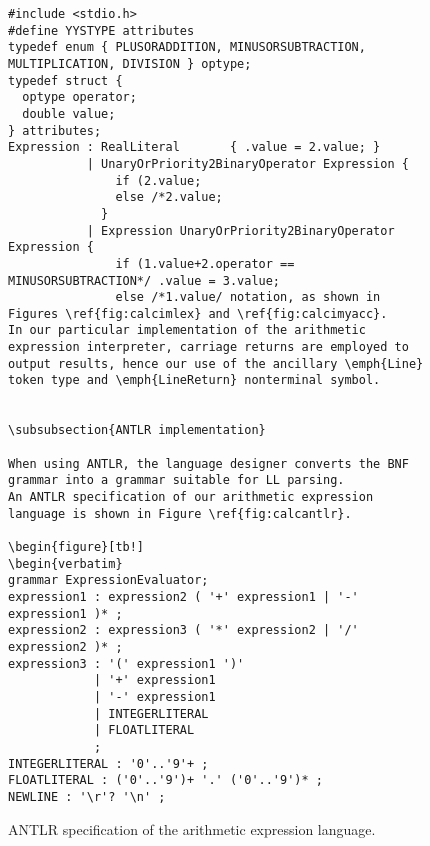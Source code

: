 \documentclass[preprint]{elsarticle}
\begin{document}
\begin{figure*}[tb!]
\begin{verbatim}
#include <stdio.h>
#define YYSTYPE attributes
typedef enum { PLUSORADDITION, MINUSORSUBTRACTION, MULTIPLICATION, DIVISION } optype;
typedef struct {
  optype operator;
  double value;
} attributes;
Expression : RealLiteral       { .value = 2.value; }
           | UnaryOrPriority2BinaryOperator Expression {
               if (2.value;
               else /*2.value;
             }
           | Expression UnaryOrPriority2BinaryOperator Expression {
               if (1.value+2.operator == MINUSORSUBTRACTION*/ .value = 3.value;
               else /*1.value/ notation, as shown in Figures \ref{fig:calcimlex} and \ref{fig:calcimyacc}.
In our particular implementation of the arithmetic expression interpreter, carriage returns are employed to output results, hence our use of the ancillary \emph{Line} token type and \emph{LineReturn} nonterminal symbol.


\subsubsection{ANTLR implementation}

When using ANTLR, the language designer converts the BNF grammar into a grammar suitable for LL parsing.
An ANTLR specification of our arithmetic expression language is shown in Figure \ref{fig:calcantlr}.

\begin{figure*}[tb!]
\begin{verbatim}
grammar ExpressionEvaluator;
expression1 : expression2 ( '+' expression1 | '-' expression1 )* ;
expression2 : expression3 ( '*' expression2 | '/' expression2 )* ;
expression3 : '(' expression1 ')'
            | '+' expression1
            | '-' expression1
            | INTEGERLITERAL
            | FLOATLITERAL
            ;
INTEGERLITERAL : '0'..'9'+ ;
FLOATLITERAL : ('0'..'9')+ '.' ('0'..'9')* ;
NEWLINE : '\r'? '\n' ;
\end{verbatim}
\caption{ANTLR specification of the arithmetic expression language.} \label{fig:calcantlr}
\end{figure*}
\end{document}
